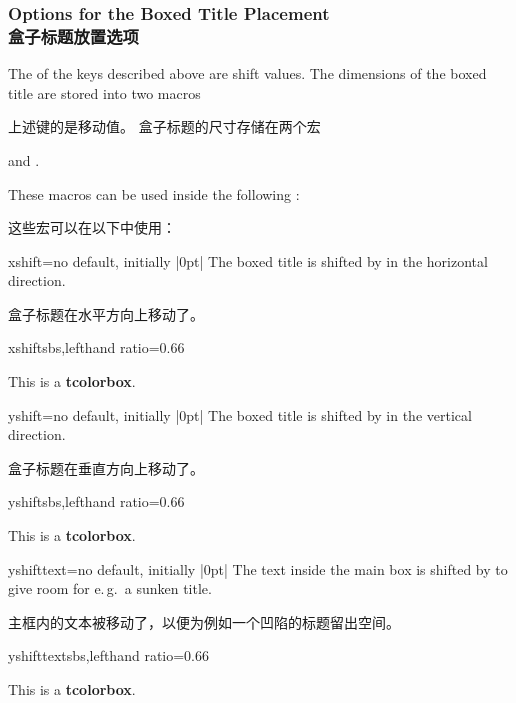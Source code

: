 
\subsubsection{Options for the Boxed Title Placement\\盒子标题放置选项}
The  of the keys described above are shift values.
The dimensions of the boxed title are stored into two macros

上述键的是移动值。 盒子标题的尺寸存储在两个宏

 and
. 

These macros can be used inside the
following :

这些宏可以在以下中使用：
\begin{boxTcbKey}{xshift}{=}{no default, initially |0pt|}
The boxed title is shifted by  in the horizontal direction.

盒子标题在水平方向上移动了。
\begin{exdispExample*}{xshift}{sbs,lefthand ratio=0.66}
\begin{tcolorbox}[enhanced,title=My title,
  attach boxed title to top left={xshift=-2mm},
  boxed title style={size=small,colback=blue}]
  This is a \textbf{tcolorbox}.
\end{tcolorbox}
\end{exdispExample*}
\end{boxTcbKey}

\begin{boxTcbKey}{yshift}{=}{no default, initially |0pt|}
The boxed title is shifted by  in the vertical direction.

盒子标题在垂直方向上移动了。
\begin{exdispExample*}{yshift}{sbs,lefthand ratio=0.66}
\begin{tcolorbox}[enhanced,title=My title,
  attach boxed title to top center=
    {yshift=-\tcboxedtitleheight/2},
  boxed title style={size=small,colback=blue}]
  This is a \textbf{tcolorbox}.
\end{tcolorbox}
\end{exdispExample*}
\end{boxTcbKey}

\begin{boxTcbKey}{yshifttext}{=}{no default, initially |0pt|}
The text inside the main box is shifted by  to give room for e.\,g.\ a sunken title.

主框内的文本被移动了，以便为例如一个凹陷的标题留出空间。
\begin{exdispExample*}{yshifttext}{sbs,lefthand ratio=0.66}
\begin{tcolorbox}[enhanced,title=My title,
  attach boxed title to top center=
    {yshift=-3mm,yshifttext=-1mm},
  boxed title style={size=small,colback=blue}]
  This is a \textbf{tcolorbox}.
\end{tcolorbox}
\end{exdispExample*}
\end{boxTcbKey}

